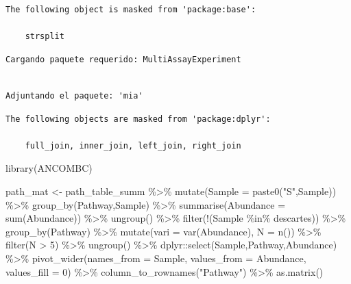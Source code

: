 \documentclass[
  letterpaper,
  DIV=11,
  numbers=noendperiod]{scrartcl}
\newenvironment{Shaded}{\begin{snugshade}}{\end{snugshade}}
\newcommand{\AttributeTok}[1]{\textcolor[rgb]{0.40,0.45,0.13}{#1}}
\newcommand{\DecValTok}[1]{\textcolor[rgb]{0.68,0.00,0.00}{#1}}
\newcommand{\FunctionTok}[1]{\textcolor[rgb]{0.28,0.35,0.67}{#1}}
\newcommand{\NormalTok}[1]{\textcolor[rgb]{0.00,0.23,0.31}{#1}}
\newcommand{\OtherTok}[1]{\textcolor[rgb]{0.00,0.23,0.31}{#1}}
\newcommand{\SpecialCharTok}[1]{\textcolor[rgb]{0.37,0.37,0.37}{#1}}
\newcommand{\StringTok}[1]{\textcolor[rgb]{0.13,0.47,0.30}{#1}}
\begin{document}
\begin{verbatim}
The following object is masked from 'package:base':

    strsplit
\end{verbatim}

\begin{verbatim}
Cargando paquete requerido: MultiAssayExperiment
\end{verbatim}

\begin{verbatim}

Adjuntando el paquete: 'mia'
\end{verbatim}

\begin{verbatim}
The following objects are masked from 'package:dplyr':

    full_join, inner_join, left_join, right_join
\end{verbatim}

\begin{Shaded}
\begin{Highlighting}[]
\FunctionTok{library}\NormalTok{(ANCOMBC)}

\NormalTok{path\_mat }\OtherTok{\textless{}{-}}\NormalTok{ path\_table\_summ }\SpecialCharTok{\%\textgreater{}\%} 
  \FunctionTok{mutate}\NormalTok{(}\AttributeTok{Sample =} \FunctionTok{paste0}\NormalTok{(}\StringTok{"S"}\NormalTok{,Sample)) }\SpecialCharTok{\%\textgreater{}\%} 
  \FunctionTok{group\_by}\NormalTok{(Pathway,Sample) }\SpecialCharTok{\%\textgreater{}\%} 
  \FunctionTok{summarise}\NormalTok{(}\AttributeTok{Abundance =} \FunctionTok{sum}\NormalTok{(Abundance)) }\SpecialCharTok{\%\textgreater{}\%} 
  \FunctionTok{ungroup}\NormalTok{() }\SpecialCharTok{\%\textgreater{}\%} 
  \FunctionTok{filter}\NormalTok{(}\SpecialCharTok{!}\NormalTok{(Sample }\SpecialCharTok{\%in\%}\NormalTok{ descartes)) }\SpecialCharTok{\%\textgreater{}\%} 
  \FunctionTok{group\_by}\NormalTok{(Pathway) }\SpecialCharTok{\%\textgreater{}\%} 
  \FunctionTok{mutate}\NormalTok{(}\AttributeTok{vari =} \FunctionTok{var}\NormalTok{(Abundance), }\AttributeTok{N =} \FunctionTok{n}\NormalTok{()) }\SpecialCharTok{\%\textgreater{}\%} 
  \FunctionTok{filter}\NormalTok{(N }\SpecialCharTok{\textgreater{}} \DecValTok{5}\NormalTok{) }\SpecialCharTok{\%\textgreater{}\%} 
  \FunctionTok{ungroup}\NormalTok{() }\SpecialCharTok{\%\textgreater{}\%} 
\NormalTok{  dplyr}\SpecialCharTok{::}\FunctionTok{select}\NormalTok{(Sample,Pathway,Abundance) }\SpecialCharTok{\%\textgreater{}\%} 
  \FunctionTok{pivot\_wider}\NormalTok{(}\AttributeTok{names\_from =}\NormalTok{ Sample, }\AttributeTok{values\_from =}\NormalTok{ Abundance, }\AttributeTok{values\_fill =} \DecValTok{0}\NormalTok{) }\SpecialCharTok{\%\textgreater{}\%} 
  \FunctionTok{column\_to\_rownames}\NormalTok{(}\StringTok{"Pathway"}\NormalTok{) }\SpecialCharTok{\%\textgreater{}\%} \FunctionTok{as.matrix}\NormalTok{()}
\end{Highlighting}
\end{Shaded}
\end{document}
